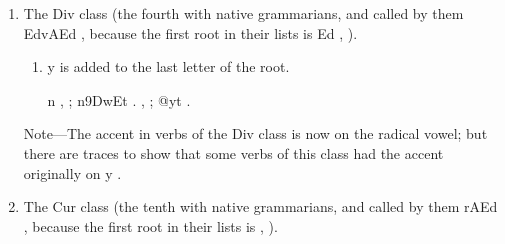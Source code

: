 \begin{enumerate}
\begin{enumerate}
    {\dn {}} , ; {\dn {}dEt} . {\dn Er}
    , ; {\dn EryEt} . {\dn {}} , ; {\dn {}vEt} . {\dn {}} , ;
  {\dn Em\5yt\?} . {\dn {}} , ;
  {\dn EkrEt} .
  \end{enumerate}

  \begin{note}
    Note—The accent in verbs of the Tud class was originally on the
    intermediate {\dn a} ; hence never guṇa of the radical vowel.
  \end{note}

\item The Div class (the fourth with native grammarians, and called by
  them {\dn EdvAEd} , because the first root in their lists is
  {\dn Ed} , ).

  \begin{enumerate}
  \item {\dn y}  is added to the last letter of the root.

    {\dn n} , ; {\dn n\39DwEt} . {\dn {}}
    , ; {\dn {}@yt\?} .
  \end{enumerate}

  \begin{note}
    Note—The accent in verbs of the Div class is now on the radical
    vowel; but there are traces to show that some verbs of this class
    had the accent originally on {\dn y} .
  \end{note}

\item The Cur class (the tenth with native grammarians, and called by
  them {\dn {}rAEd} , because the first root in their lists is
  {\dn {}} , ).


\end{enumerate}

